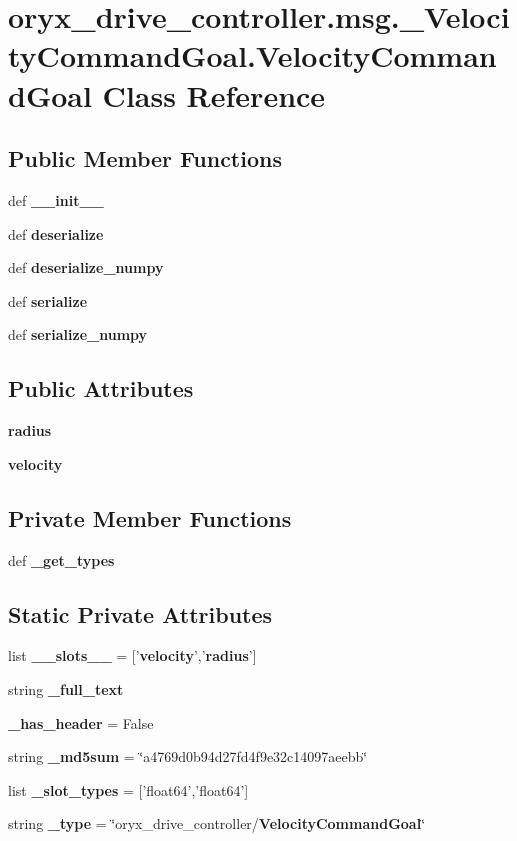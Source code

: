 \section{oryx\-\_\-drive\-\_\-controller.\-msg.\-\_\-\-Velocity\-Command\-Goal.\-Velocity\-Command\-Goal \-Class \-Reference}
\label{classoryx__drive__controller_1_1msg_1_1__VelocityCommandGoal_1_1VelocityCommandGoal}
\subsection*{\-Public \-Member \-Functions}
\begin{DoxyCompactItemize}
\item 
def {\bf \-\_\-\-\_\-init\-\_\-\-\_\-}
\item 
def {\bf deserialize}
\item 
def {\bf deserialize\-\_\-numpy}
\item 
def {\bf serialize}
\item 
def {\bf serialize\-\_\-numpy}
\end{DoxyCompactItemize}
\subsection*{\-Public \-Attributes}
\begin{DoxyCompactItemize}
\item 
{\bf radius}
\item 
{\bf velocity}
\end{DoxyCompactItemize}
\subsection*{\-Private \-Member \-Functions}
\begin{DoxyCompactItemize}
\item 
def {\bf \-\_\-get\-\_\-types}
\end{DoxyCompactItemize}
\subsection*{\-Static \-Private \-Attributes}
\begin{DoxyCompactItemize}
\item 
list {\bf \-\_\-\-\_\-slots\-\_\-\-\_\-} = ['{\bf velocity}','{\bf radius}']
\item 
string {\bf \-\_\-full\-\_\-text}
\item 
{\bf \-\_\-has\-\_\-header} = \-False
\item 
string {\bf \-\_\-md5sum} = \char`\"{}a4769d0b94d27fd4f9e32c14097aeebb\char`\"{}
\item 
list {\bf \-\_\-slot\-\_\-types} = ['float64','float64']
\item 
string {\bf \-\_\-type} = \char`\"{}oryx\-\_\-drive\-\_\-controller/{\bf \-Velocity\-Command\-Goal}\char`\"{}
\end{DoxyCompactItemize}



